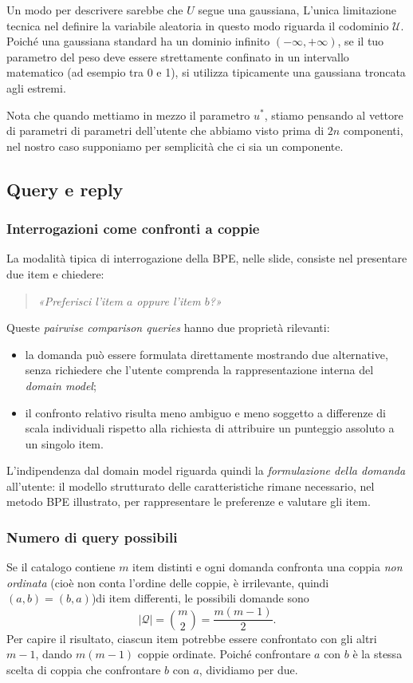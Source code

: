 Un modo per descrivere sarebbe che $U$ segue una gaussiana, L'unica limitazione tecnica nel definire la variabile aleatoria in questo modo riguarda il codominio $\mathcal{U}$. Poiché una gaussiana standard ha un dominio infinito $(-\infty, +\infty)$, se il tuo parametro del peso deve essere strettamente confinato in un intervallo matematico (ad esempio tra 0 e 1), si utilizza tipicamente una gaussiana troncata agli estremi.
\begin{observation}{}
    Nota che quando mettiamo in mezzo il parametro $u^*$, stiamo pensando al vettore di parametri di parametri dell'utente che abbiamo visto prima di $2n$ componenti, nel nostro caso supponiamo per semplicità che ci sia un componente.
\end{observation}


\subsection{Query e reply}

\subsubsection{Interrogazioni come confronti a coppie}
La modalità tipica di interrogazione della BPE, nelle slide, consiste nel presentare due item e chiedere:
\begin{quote}
\emph{«Preferisci l'item $a$ oppure l'item $b$?»}
\end{quote}
Queste \emph{pairwise comparison queries} hanno due proprietà rilevanti:
\begin{itemize}
    \item la domanda può essere formulata direttamente mostrando due alternative, senza richiedere che l'utente comprenda la rappresentazione interna del \emph{domain model};
    \item il confronto relativo risulta meno ambiguo e meno soggetto a differenze di scala individuali rispetto alla richiesta di attribuire un punteggio assoluto a un singolo item.
\end{itemize}
L'indipendenza dal domain model riguarda quindi la \emph{formulazione della domanda} all'utente: il modello strutturato delle caratteristiche rimane necessario, nel metodo BPE illustrato, per rappresentare le preferenze e valutare gli item.

\subsubsection{Numero di query possibili}
Se il catalogo contiene $m$ item distinti e ogni domanda confronta una coppia \emph{non ordinata} (cioè non conta l'ordine delle coppie, è irrilevante, quindi $(a,b) = (b,a)$)di item differenti, le possibili domande sono
\[
\boxed{|\mathcal Q|=\binom{m}{2}=\frac{m(m-1)}{2}.}
\]
Per capire il risultato, ciascun item potrebbe essere confrontato con gli altri $m-1$, dando $m(m-1)$ coppie ordinate. Poiché confrontare $a$ con $b$ è la stessa scelta di coppia che confrontare $b$ con $a$, dividiamo per due.

